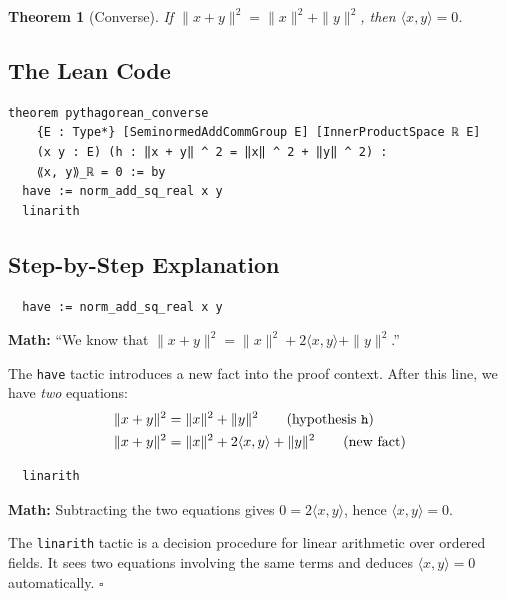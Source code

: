 \documentclass[11pt]{article}
\theoremstyle{plain}
\newtheorem{theorem}{Theorem}[section]
\theoremstyle{definition}
\begin{document}
\begin{theorem}[Converse]
If $\|x+y\|^2 = \|x\|^2 + \|y\|^2$, then $\langle x,y\rangle = 0$.
\end{theorem}

\subsection{The Lean Code}

\begin{lstlisting}
theorem pythagorean_converse
    {E : Type*} [SeminormedAddCommGroup E] [InnerProductSpace ℝ E]
    (x y : E) (h : ‖x + y‖ ^ 2 = ‖x‖ ^ 2 + ‖y‖ ^ 2) :
    ⟪x, y⟫_ℝ = 0 := by
  have := norm_add_sq_real x y
  linarith
\end{lstlisting}

\subsection{Step-by-Step Explanation}

\begin{tcolorbox}[title=Line 5: Introduce the polarization identity as a fact]
\begin{lstlisting}
  have := norm_add_sq_real x y
\end{lstlisting}
\textbf{Math:} ``We know that
$\|x+y\|^2 = \|x\|^2 + 2\langle x,y\rangle + \|y\|^2$.''

The \texttt{have} tactic introduces a new fact into the proof context. After this
line, we have \emph{two} equations:
\begin{align*}
  &\|x+y\|^2 = \|x\|^2 + \|y\|^2 \qquad\text{(hypothesis \texttt{h})} \\
  &\|x+y\|^2 = \|x\|^2 + 2\langle x,y\rangle + \|y\|^2 \qquad\text{(new fact)}
\end{align*}
\end{tcolorbox}

\begin{tcolorbox}[title=Line 6: Linear arithmetic finishes the proof]
\begin{lstlisting}
  linarith
\end{lstlisting}
\textbf{Math:} Subtracting the two equations gives $0 = 2\langle x,y\rangle$,
hence $\langle x,y\rangle = 0$.

The \texttt{linarith} tactic is a decision procedure for linear arithmetic over
ordered fields. It sees two equations involving the same terms and deduces
$\langle x,y\rangle = 0$ automatically. $\square$
\end{tcolorbox}
\end{document}
